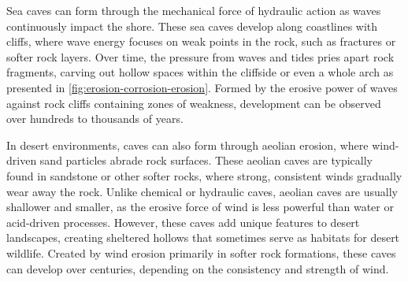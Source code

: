 Sea caves can form through the mechanical force of hydraulic action as waves continuously impact the shore. These sea caves develop along coastlines with cliffs, where wave energy focuses on weak points in the rock, such as fractures or softer rock layers. Over time, the pressure from waves and tides pries apart rock fragments, carving out hollow spaces within the cliffside or even a whole arch as presented in \cref{fig:erosion-corrosion-erosion}. Formed by the erosive power of waves against rock cliffs containing zones of weakness, development can be observed over hundreds to thousands of years.

In desert environments, caves can also form through aeolian erosion, where wind-driven sand particles abrade rock surfaces. These aeolian caves are typically found in sandstone or other softer rocks, where strong, consistent winds gradually wear away the rock. Unlike chemical or hydraulic caves, aeolian caves are usually shallower and smaller, as the erosive force of wind is less powerful than water or acid-driven processes. However, these caves add unique features to desert landscapes, creating sheltered hollows that sometimes serve as habitats for desert wildlife. Created by wind erosion primarily in softer rock formations, these caves can develop over centuries, depending on the consistency and strength of wind.

\smallConclusion


